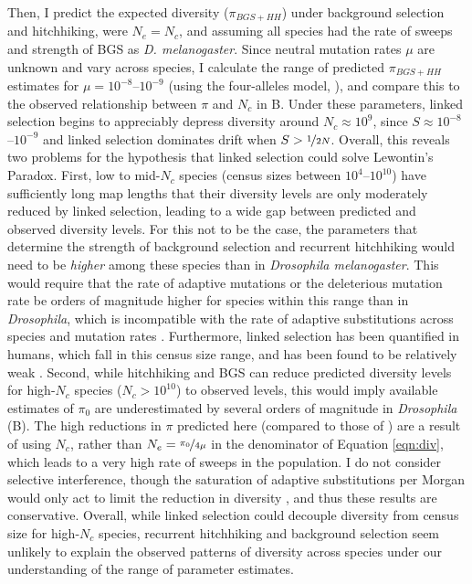 \documentclass[9pt,lineno]{elife}
\begin{document}
Then, I predict the expected diversity ($\pi_{BGS+HH}$) under background
selection and hitchhiking, were $N_e= N_c$, and assuming all species had the
rate of sweeps and strength of BGS as \emph{D. melanogaster}. Since neutral
mutation rates $\mu$ are unknown and vary across species, I calculate the range
of predicted $\pi_{BGS+HH}$ estimates for $\mu = 10^{-8}$--$10^{-9}$ (using the
four-alleles model, \cite{Tajima1996-rb}), and compare this to the observed
relationship between $\pi$ and $N_c$ in B.  Under these
parameters, linked selection begins to appreciably depress diversity around
$N_c \approx 10^9$, since $S \approx 10^{-8}$--$10^{-9}$ and linked selection
dominates drift when $S > \nicefrac{1}{2N}$.  Overall, this reveals two
problems for the hypothesis that linked selection could solve Lewontin's
Paradox. First, low to mid-$N_c$ species (census sizes between
$10^{4}$--$10^{10}$) have sufficiently long map lengths that their diversity
levels are only moderately reduced by linked selection, leading to a wide gap
between predicted and observed diversity levels. For this not to be the case,
the parameters that determine the strength of background selection and
recurrent hitchhiking would need to be \emph{higher} among these species than
in \emph{Drosophila melanogaster}. This would require that the rate of adaptive
mutations or the deleterious mutation rate be orders of magnitude higher for
species within this range than in \emph{Drosophila}, which is incompatible with
the rate of adaptive substitutions across species \citep{Galtier2016-dq} and
mutation rates \citep{Lynch2010-ki}. Furthermore, linked selection has been
quantified in humans, which fall in this census size range, and has been found
to be relatively weak
\citep{McVicker2009-ax,Hernandez2011-gs,Hellmann2008-ic,Cai2009-by,Boyko2008-tj}.
Second, while hitchhiking and BGS can reduce predicted diversity levels for
high-$N_c$ species ($N_c > 10^{10}$) to observed levels, this would imply
available estimates of $\pi_0$ are underestimated by several orders of
magnitude in \emph{Drosophila} (B). The high
reductions in $\pi$ predicted here (compared to those of
\cite{Elyashiv2016-vt}) are a result of using $N_c$, rather than $N_e =
\nicefrac{\pi_0}{4 \mu}$ in the denominator of Equation \eqref{eqn:div}, which
leads to a very high rate of sweeps in the population.  I do not consider
selective interference, though the saturation of adaptive substitutions per
Morgan would only act to limit the reduction in diversity
\citep{Weissman2012-aa}, and thus these results are conservative.  Overall,
while linked selection could decouple diversity from census size for high-$N_c$
species, recurrent hitchhiking and background selection seem unlikely to
explain the observed patterns of diversity across species under our
understanding of the range of parameter estimates.
\end{document}
